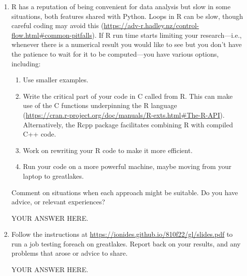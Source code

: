 \documentclass[12pt]{article}
\begin{document}
\begin{enumerate}

\item R has a reputation of being convenient for data analysis but slow in some situations, both features shared with Python. Loops in R can be slow, though careful coding may avoid this (\url{https://adv-r.hadley.nz/control-flow.html#common-pitfalls}). If R run time starts limiting your research---i.e., whenever there is a numerical result you would like to see but you don't have the patience to wait for it to be computed---you have various options, including:
  \begin{enumerate}
  \item Use smaller examples.
  \item Write the critical part of your code in C called from R. This can make use of the C functions underpinning the R language\\
    (\url{https://cran.r-project.org/doc/manuals/R-exts.html#The-R-API}).
    \\
    Alternatively, the Rcpp package facilitates combining R with compiled C++ code.
  \item Work on rewriting your R code to make it more efficient.
  \item Run your code on a more powerful machine, maybe moving from your laptop to greatlakes.
  \end{enumerate}
Comment on situations when each approach might be suitable. Do you have advice, or relevant experiences?
  
  YOUR ANSWER HERE.

\item Follow the instructions at \url{https://ionides.github.io/810f22/gl/slides.pdf} to run a job testing foreach on greatlakes. Report back on your results, and any problems that arose or advice to share.

YOUR ANSWER HERE.
  
\end{enumerate}
\end{document}
